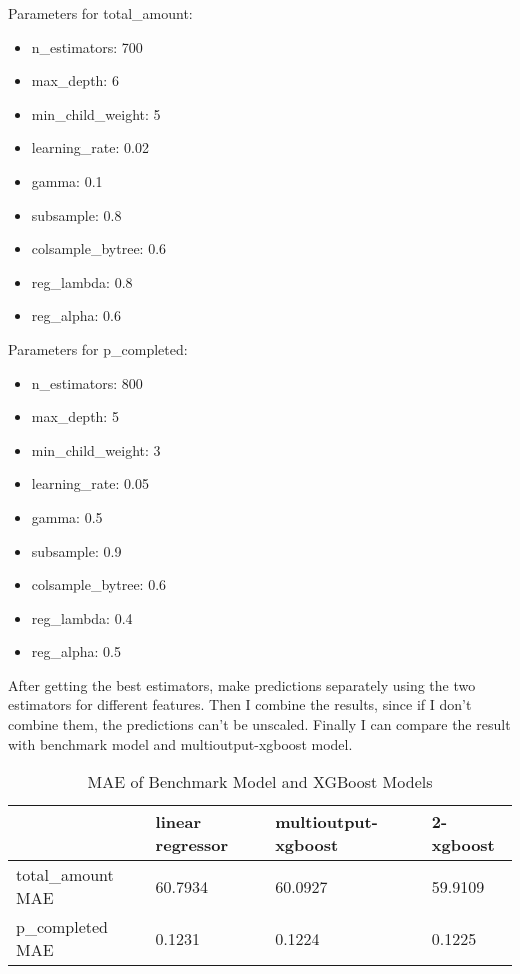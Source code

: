 \documentclass[a4paper,12pt]{article}
\begin{document}
\begin{multicols}{2}

Parameters for total\_amount:

\begin{itemize}

    \item n\_estimators: 700
    \item max\_depth: 6
    \item min\_child\_weight: 5
    \item learning\_rate: 0.02
    \item gamma: 0.1
    \item subsample: 0.8
    \item colsample\_bytree: 0.6
    \item reg\_lambda: 0.8
    \item reg\_alpha: 0.6

\end{itemize}

Parameters for p\_completed:

\begin{itemize}

    \item n\_estimators: 800
    \item max\_depth: 5
    \item min\_child\_weight: 3
    \item learning\_rate: 0.05
    \item gamma: 0.5
    \item subsample: 0.9
    \item colsample\_bytree: 0.6
    \item reg\_lambda: 0.4
    \item reg\_alpha: 0.5

\end{itemize}
    
\end{multicols}

After getting the best estimators, make predictions separately using the two estimators for different features. Then I combine 
the results, since if I don't combine them, the predictions can't be unscaled. Finally I can compare the result with benchmark 
model and multioutput-xgboost model.

\begin{table}[H]
    \centering
    \begin{tabular}{|l|l|l|l|}
    \hline
                        & linear regressor & multioutput-xgboost & 2-xgboost \\
    \hline
    total\_amount MAE   & 60.7934          & 60.0927             & 59.9109 \\
    \hline
    p\_completed  MAE   & 0.1231           & 0.1224              & 0.1225 \\
    \hline
    \end{tabular}
    \caption{MAE of Benchmark Model and XGBoost Models}
\end{table}
\end{document}
